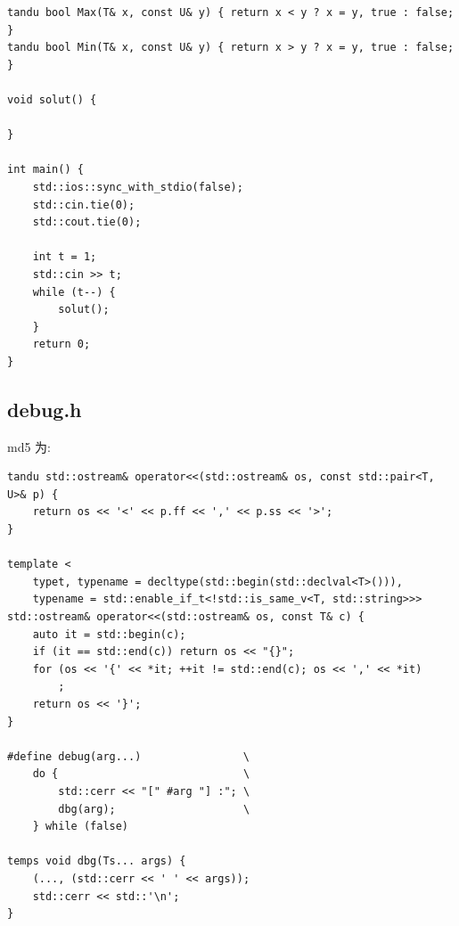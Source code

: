 \documentclass[UTF8, a4paper, titlepage, twoside]{ctexart}
\begin{document}
\begin{lstlisting}[style=cpp]
tandu bool Max(T& x, const U& y) { return x < y ? x = y, true : false; }
tandu bool Min(T& x, const U& y) { return x > y ? x = y, true : false; }

void solut() {
    
}

int main() {
    std::ios::sync_with_stdio(false);
    std::cin.tie(0);
    std::cout.tie(0);

    int t = 1;
    std::cin >> t;
    while (t--) {
        solut();
    }
    return 0;
}
\end{lstlisting}

\subsection{ debug.h }
md5 为: 
\begin{lstlisting}[style=cpp]
tandu std::ostream& operator<<(std::ostream& os, const std::pair<T, U>& p) {
    return os << '<' << p.ff << ',' << p.ss << '>';
}

template <
    typet, typename = decltype(std::begin(std::declval<T>())),
    typename = std::enable_if_t<!std::is_same_v<T, std::string>>>
std::ostream& operator<<(std::ostream& os, const T& c) {
    auto it = std::begin(c);
    if (it == std::end(c)) return os << "{}";
    for (os << '{' << *it; ++it != std::end(c); os << ',' << *it)
        ;
    return os << '}';
}

#define debug(arg...)                \
    do {                             \
        std::cerr << "[" #arg "] :"; \
        dbg(arg);                    \
    } while (false)

temps void dbg(Ts... args) {
    (..., (std::cerr << ' ' << args));
    std::cerr << std::'\n';
}
\end{lstlisting}
\end{document}
